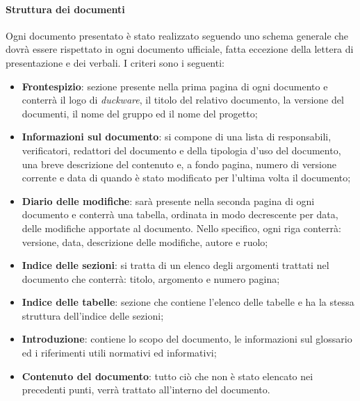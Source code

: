 \paragraph{Struttura dei documenti}
Ogni documento presentato è stato realizzato seguendo uno schema generale che dovrà essere rispettato in ogni documento ufficiale, fatta eccezione della lettera di presentazione e dei verbali. I criteri sono i seguenti:
\begin{itemize}
	\item \textbf{Frontespizio}: sezione presente nella prima pagina di ogni documento e conterrà il logo di \emph{duckware}, il titolo del relativo documento, la versione del documenti, il nome del gruppo ed il nome del progetto;
	\item \textbf{Informazioni sul documento}: si compone di una lista di responsabili, verificatori, redattori del documento e della tipologia d’uso del documento, una breve descrizione del contenuto e, a fondo pagina, numero di versione corrente e data di quando è stato modificato per l'ultima volta il documento;
	\item \textbf{Diario delle modifiche}: sarà presente nella seconda pagina di ogni documento e conterrà una tabella, ordinata in modo decrescente per data, delle modifiche apportate al documento. Nello specifico, ogni riga conterrà: versione, data, descrizione delle modifiche, autore e ruolo;
	\item \textbf{Indice delle sezioni}: si tratta di un elenco degli argomenti trattati nel documento che conterrà: titolo, argomento e numero pagina;
	\item \textbf{Indice delle tabelle}: sezione che contiene l’elenco delle tabelle e ha la stessa struttura dell’indice delle sezioni;
	\item \textbf{Introduzione}: contiene lo scopo del documento, le informazioni sul glossario ed i riferimenti utili normativi ed informativi;
	\item \textbf{Contenuto del documento}: tutto ciò che non è stato elencato nei precedenti punti, verrà trattato all’interno del documento.
\end{itemize}
